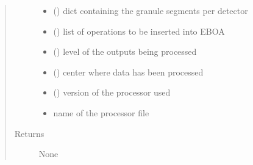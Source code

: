 \begin{fulllineitems}
\begin{quote}
\begin{description}
\begin{itemize}
\item {} 
\sphinxAtStartPar
{} () \textendash{} dict containing the granule segments per detector

\item {} 
\sphinxAtStartPar
{} () \textendash{} list of operations to be inserted into EBOA

\item {} 
\sphinxAtStartPar
{} () \textendash{} level of the outputs being processed

\item {} 
\sphinxAtStartPar
{} () \textendash{} center where data has been processed

\item {} 
\sphinxAtStartPar
{} () \textendash{} version of the processor used

\item {} 
\sphinxAtStartPar
{} \textendash{} name of the processor file

\end{itemize}

\item[{Returns}] \leavevmode
\sphinxAtStartPar
None

\end{description}\end{quote}

\end{fulllineitems}


